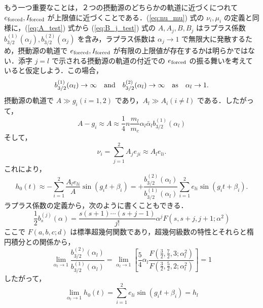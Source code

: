 \documentclass[11pt,a4paper,oneside,onecolumn]{jreport}
\begin{document}
もう一つ重要なことは，２つの摂動源のどちらかの軌道に近づくにつれて $e_{\rm forced}, I_{\rm forced}$ が上限値に近づくことである．(\ref{eq:nu_mu}) 式の $\nu_i, \mu_i$ の定義と同様に，(\ref{eq:A_test}) 式から (\ref{eq:B_j_test}) 式の $A, A_j, B, B_j$ はラプラス係数 $b_{3/2}^{(1)} (\alpha_j), b_{3/2}^{(2)} (\alpha_j)$ を含み，ラプラス係数は $\alpha_j \rightarrow 1$ で無限大に発散するため，摂動源の軌道で $e_{\rm forced}, I_{\rm forced}$ が有限の上限値が存在するかは明らかではない．添字 $j = l$ で示される摂動源の軌道の付近での $e_{\rm forced}$ の振る舞いを考えていると仮定しよう．この場合，
\begin{equation}
b_{3/2}^{(1)} (\alpha_l) \rightarrow \infty \quad {\rm and} \quad b_{3/2}^{(2)} (\alpha_l) \rightarrow \infty \quad {\rm as} \quad \alpha_l \rightarrow 1.
\end{equation}
摂動源の軌道で $A \gg g_i (i = 1, 2)$ であり，$A_l \gg A_i (i \not= l)$ である．したがって，
\begin{equation}
A - g_i \approx A \approx \frac{1}{4} n \frac{m_l}{m_c} \alpha_l \bar{\alpha}_l b_{3/2}^{(1)} (\alpha_l)
\end{equation}
そして，
\begin{equation}
\nu_i = \sum_{j = 1}^{2} A_j e_{ji} \approx A_l e_{li}.
\end{equation}
これにより，
\begin{equation}
h_0 (t) \approx - \sum_{i = 1}^{2} \frac{A_l e_{li}}{A} \sin (g_i t + \beta_i) = + \frac{b_{3/2}^{(2)} (\alpha_l)}{b_{3/2}^{(1)} (\alpha_l)} \sum_{i = 1}^{2} e_{li} \sin (g_i t + \beta_i).
\end{equation}
ラプラス係数の定義から，次のように書くこともできる．
\begin{equation}
\frac{1}{2} b_{s}^{(j)} (\alpha) = \frac{s (s + 1) \cdots (s + j - 1)}{j !} \alpha^j F (s, s + j, j + 1; \alpha^2)
\end{equation}
ここで $F (a, b, c; d)$ は標準超幾何関数であり，超幾何級数の特性とそれらと楕円積分との関係から，
\begin{equation}
\lim_{\alpha_l \rightarrow 1} \frac{b_{3/2}^{(2)} (\alpha_l)}{b_{3/2}^{(1)} (\alpha_l)} = \lim_{\alpha_l \rightarrow 1} \left[ \frac{5}{4} \alpha_l \frac{F (\frac{3}{2}, \frac{7}{2}, 3; \alpha_l^2)}{F (\frac{3}{2}, \frac{5}{2}, 2; \alpha_l^2)} \right] = 1
\end{equation}
したがって，
\begin{equation}
\lim_{\alpha_l \rightarrow 1} h_0 (t) = \sum_{i = 1}^2 e_{li} \sin (g_i t + \beta_i) = h_l
\end{equation}
\end{document}
